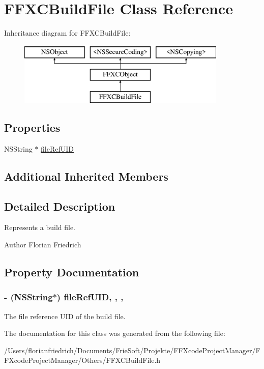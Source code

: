 \hypertarget{interface_f_f_x_c_build_file}{\section{F\-F\-X\-C\-Build\-File Class Reference}
\label{interface_f_f_x_c_build_file}
}
Inheritance diagram for F\-F\-X\-C\-Build\-File\-:\begin{figure}[H]
\begin{center}
\leavevmode
\includegraphics[height=3.000000cm]{interface_f_f_x_c_build_file}
\end{center}
\end{figure}
\subsection*{Properties}
\begin{DoxyCompactItemize}
\item 
N\-S\-String $\ast$ \hyperlink{interface_f_f_x_c_build_file_a9e407cb844954efe939f63af7df968ac}{file\-Ref\-U\-I\-D}
\end{DoxyCompactItemize}
\subsection*{Additional Inherited Members}


\subsection{Detailed Description}
Represents a build file. \begin{DoxyAuthor}{Author}
Florian Friedrich 
\end{DoxyAuthor}


\subsection{Property Documentation}
\hypertarget{interface_f_f_x_c_build_file_a9e407cb844954efe939f63af7df968ac}{
\subsubsection[{file\-Ref\-U\-I\-D}]{\setlength{\rightskip}{0pt plus 5cm}-\/ (N\-S\-String$\ast$) file\-Ref\-U\-I\-D\hspace{0.3cm}{\ttfamily [read]}, {\ttfamily [write]}, {\ttfamily [nonatomic]}, {\ttfamily [strong]}}}\label{interface_f_f_x_c_build_file_a9e407cb844954efe939f63af7df968ac}
The file reference U\-I\-D of the build file. 

The documentation for this class was generated from the following file\-:\begin{DoxyCompactItemize}
\item 
/\-Users/florianfriedrich/\-Documents/\-Frie\-Soft/\-Projekte/\-F\-F\-Xcode\-Project\-Manager/\-F\-F\-Xcode\-Project\-Manager/\-Others/F\-F\-X\-C\-Build\-File.\-h\end{DoxyCompactItemize}
